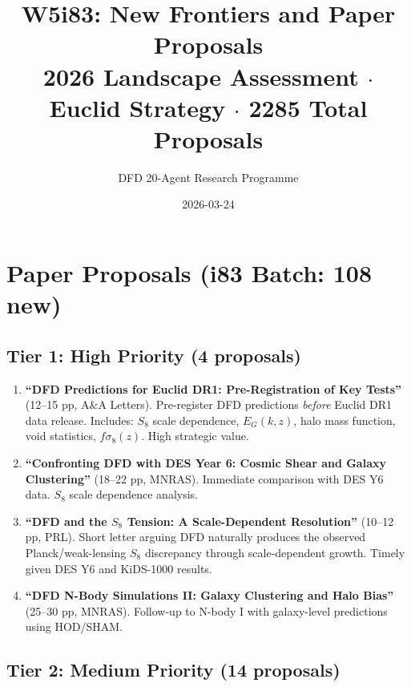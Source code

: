 \documentclass[11pt,a4paper]{article}
\title{W5i83: New Frontiers and Paper Proposals\\[6pt]
\large 2026 Landscape Assessment $\cdot$ Euclid Strategy $\cdot$ 2285 Total Proposals}
\author{DFD 20-Agent Research Programme}
\date{2026-03-24}
\begin{document}
\maketitle

\section{Paper Proposals (i83 Batch: 108 new)}

\subsection{Tier 1: High Priority (4 proposals)}

\begin{enumerate}[nosep]
\item \textbf{``DFD Predictions for Euclid DR1: Pre-Registration of Key Tests''} (12--15 pp, A\&A Letters). Pre-register DFD predictions \emph{before} Euclid DR1 data release. Includes: $S_8$ scale dependence, $E_G(k,z)$, halo mass function, void statistics, $f\sigma_8(z)$. High strategic value.

\item \textbf{``Confronting DFD with DES Year 6: Cosmic Shear and Galaxy Clustering''} (18--22 pp, MNRAS). Immediate comparison with DES Y6 data. $S_8$ scale dependence analysis.

\item \textbf{``DFD and the $S_8$ Tension: A Scale-Dependent Resolution''} (10--12 pp, PRL). Short letter arguing DFD naturally produces the observed Planck/weak-lensing $S_8$ discrepancy through scale-dependent growth. Timely given DES Y6 and KiDS-1000 results.

\item \textbf{``DFD N-Body Simulations II: Galaxy Clustering and Halo Bias''} (25--30 pp, MNRAS). Follow-up to N-body I with galaxy-level predictions using HOD/SHAM.
\end{enumerate}

\subsection{Tier 2: Medium Priority (14 proposals)}
\end{document}
